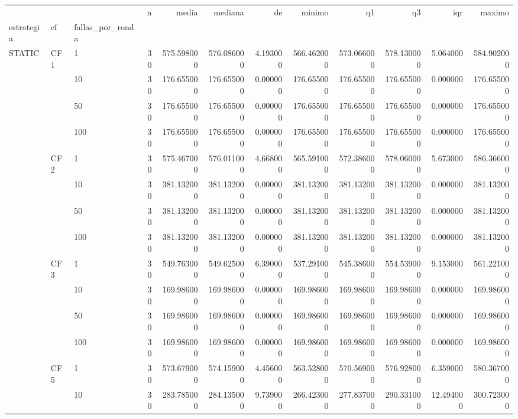 \begin{tabular}{lllrrrrrrrrr}
\toprule
 &  &  & n & media & mediana & de & minimo & q1 & q3 & iqr & maximo \\
estrategia & cf & fallas_por_ronda &  &  &  &  &  &  &  &  &  \\
\midrule
\multirow[t]{16}{*}{STATIC} & \multirow[t]{4}{*}{CF1} & 1 & 30 & 575.598000 & 576.086000 & 4.193000 & 566.462000 & 573.066000 & 578.130000 & 5.064000 & 584.902000 \\
 &  & 10 & 30 & 176.655000 & 176.655000 & 0.000000 & 176.655000 & 176.655000 & 176.655000 & 0.000000 & 176.655000 \\
 &  & 50 & 30 & 176.655000 & 176.655000 & 0.000000 & 176.655000 & 176.655000 & 176.655000 & 0.000000 & 176.655000 \\
 &  & 100 & 30 & 176.655000 & 176.655000 & 0.000000 & 176.655000 & 176.655000 & 176.655000 & 0.000000 & 176.655000 \\
\cline{2-12}
 & \multirow[t]{4}{*}{CF2} & 1 & 30 & 575.467000 & 576.011000 & 4.668000 & 565.591000 & 572.386000 & 578.060000 & 5.673000 & 586.366000 \\
 &  & 10 & 30 & 381.132000 & 381.132000 & 0.000000 & 381.132000 & 381.132000 & 381.132000 & 0.000000 & 381.132000 \\
 &  & 50 & 30 & 381.132000 & 381.132000 & 0.000000 & 381.132000 & 381.132000 & 381.132000 & 0.000000 & 381.132000 \\
 &  & 100 & 30 & 381.132000 & 381.132000 & 0.000000 & 381.132000 & 381.132000 & 381.132000 & 0.000000 & 381.132000 \\
\cline{2-12}
 & \multirow[t]{4}{*}{CF3} & 1 & 30 & 549.763000 & 549.625000 & 6.390000 & 537.291000 & 545.386000 & 554.539000 & 9.153000 & 561.221000 \\
 &  & 10 & 30 & 169.986000 & 169.986000 & 0.000000 & 169.986000 & 169.986000 & 169.986000 & 0.000000 & 169.986000 \\
 &  & 50 & 30 & 169.986000 & 169.986000 & 0.000000 & 169.986000 & 169.986000 & 169.986000 & 0.000000 & 169.986000 \\
 &  & 100 & 30 & 169.986000 & 169.986000 & 0.000000 & 169.986000 & 169.986000 & 169.986000 & 0.000000 & 169.986000 \\
\cline{2-12}
 & \multirow[t]{4}{*}{CF5} & 1 & 30 & 573.679000 & 574.159000 & 4.456000 & 563.528000 & 570.569000 & 576.928000 & 6.359000 & 580.367000 \\
 &  & 10 & 30 & 283.785000 & 284.135000 & 9.739000 & 266.423000 & 277.837000 & 290.331000 & 12.494000 & 300.723000 \\

\end{tabular}
